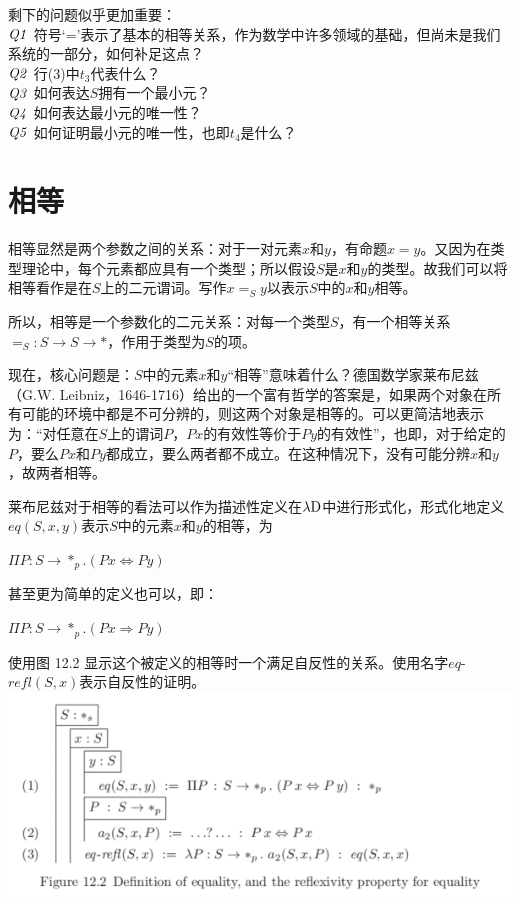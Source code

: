\documentclass[UTF8]{article}
\begin{document}
		剩下的问题似乎更加重要：\\
		$\it{Q1}$ 符号`='表示了基本的相等关系，作为数学中许多领域的基础，但尚未是我们系统的一部分，如何补足这点？\\
		$\it{Q2}$ 行(3)中$t_3$代表什么？\\
		$\it{Q3}$ 如何表达$S$拥有一个最小元？\\
		$\it{Q4}$ 如何表达最小元的唯一性？\\
		$\it{Q5}$ 如何证明最小元的唯一性，也即$t_4$是什么？
		
	\section{相等}
	\noindent
	相等显然是两个参数之间的关系：对于一对元素$x$和$y$，有命题$x=y$。又因为在类型理论中，每个元素都应具有一个类型；所以假设$S$是$x$和$y$的类型。故我们可以将相等看作是在$S$上的二元谓词。写作$x=_S y$以表示$S$中的$x$和$y$相等。
	
		所以，相等是一个参数化的二元关系：对每一个类型$S$，有一个相等关系$=_S:S\rightarrow S\rightarrow*$，作用于类型为$S$的项。
		
		现在，核心问题是：$S$中的元素$x$和$y$“相等”意味着什么？德国数学家莱布尼兹（G.W. Leibniz，1646-1716）给出的一个富有哲学的答案是，如果两个对象在所有可能的环境中都是不可分辨的，则这两个对象是相等的。可以更简洁地表示为：“对任意在$S$上的谓词$P$，$Px$的有效性等价于$Py$的有效性”，也即，对于给定的$P$，要么$Px$和$Py$都成立，要么两者都不成立。在这种情况下，没有可能分辨$x$和$y$，故两者相等。
		
		莱布尼兹对于相等的看法可以作为描述性定义在$\lambda{\rm D}$中进行形式化，形式化地定义$eq(S,x,y)$表示$S$中的元素$x$和$y$的相等，为
		
		$\Pi P:S\rightarrow*_p.(Px\Leftrightarrow Py)$
		
		甚至更为简单的定义也可以，即：
		
		$\Pi P:S\rightarrow*_p.(Px\Rightarrow Py)$
		
		使用图 12.2 显示这个被定义的相等时一个满足自反性的关系。使用名字$eq$-$refl(S,x)$表示自反性的证明。\\
		\includegraphics[width=0.93\linewidth]{"../imgs/12-3.png"}
		
\end{document}

